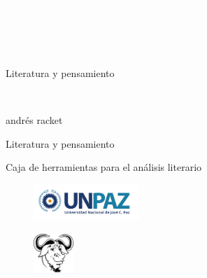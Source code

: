 \newpage
\thispagestyle{empty}
{\textcolor{white}{.}}

\newpage
\thispagestyle{empty}
{\textcolor{white}{.}}

\newpage
\thispagestyle{empty}
{\textcolor{white}{.}}

\vspace{30mm}

\begin{center}
	\LARGE{Literatura y pensamiento}
\end{center}

\newpage
\thispagestyle{empty}
{\textcolor{white}{.}}

\newpage
\thispagestyle{empty}
\begin{center}%
{\sc\large{andrés racket}}\\ %
\end{center}

\vspace{30mm}

\begin{center}
\LARGE{Literatura y pensamiento}\\\vspace{10mm}

\Large{Caja de herramientas para el análisis literario}
\end{center}

\vfill

\begin{figure}[b]
\centering
\includegraphics[width=40mm]{./media/unpaz_logo.png}
\end{figure}

\newpage
\thispagestyle{empty}
\begin{figure}[t]
\centering
\vspace{-10mm}
\includegraphics[width=15mm]{./media/logo-GNU.png}\\
\end{figure}

